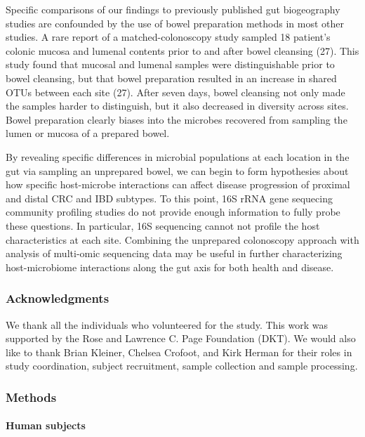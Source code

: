 \documentclass[11pt,]{article}
\let\oldparagraph\paragraph
\renewcommand{\paragraph}[1]{\oldparagraph{#1}\mbox{}}
\begin{document}
Specific comparisons of our findings to previously published gut
biogeography studies are confounded by the use of bowel preparation
methods in most other studies. A rare report of a matched-colonoscopy
study sampled 18 patient's colonic mucosa and lumenal contents prior to
and after bowel cleansing (27). This study found that mucosal and
lumenal samples were distinguishable prior to bowel cleansing, but that
bowel preparation resulted in an increase in shared OTUs between each
site (27). After seven days, bowel cleansing not only made the samples
harder to distinguish, but it also decreased in diversity across sites.
Bowel preparation clearly biases into the microbes recovered from
sampling the lumen or mucosa of a prepared bowel.

By revealing specific differences in microbial populations at each
location in the gut via sampling an unprepared bowel, we can begin to
form hypothesies about how specific host-microbe interactions can affect
disease progression of proximal and distal CRC and IBD subtypes. To this
point, 16S rRNA gene sequecing community profiling studies do not
provide enough information to fully probe these questions. In
particular, 16S sequencing cannot not profile the host characteristics
at each site. Combining the unprepared colonoscopy approach with
analysis of multi-omic sequencing data may be useful in further
characterizing host-microbiome interactions along the gut axis for both
health and disease.

\subsubsection{Acknowledgments}\label{acknowledgments}

We thank all the individuals who volunteered for the study. This work
was supported by the Rose and Lawrence C. Page Foundation (DKT). We
would also like to thank Brian Kleiner, Chelsea Crofoot, and Kirk Herman
for their roles in study coordination, subject recruitment, sample
collection and sample processing.

\subsubsection{Methods}\label{methods}

\paragraph{Human subjects}\label{human-subjects}
\end{document}
